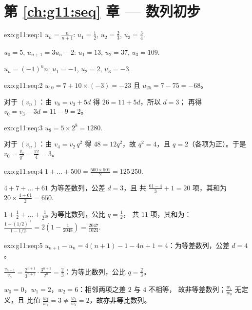 \section*{第 \ref{ch:g11:seq} 章 --- 数列初步}

\begin{solution}{exo:g11:seq:1}
$u_n = \frac{n}{n+1}$: $u_1 = \frac12$, $u_2 = \frac23$,
$u_3 = \frac34$.

$u_0 = 5$, $u_{n+1} = 3u_n - 2$: $u_1 = 13$, $u_2 = 37$, $u_3 = 109$.

$u_n = (-1)^n n$: $u_1 = -1$, $u_2 = 2$, $u_3 = -3$.
\end{solution}

\begin{solution}{exo:g11:seq:2}
$u_{10} = 7 + 10 \times (-3) = -23$ 且 $u_{25} = 7 - 75 = -68$。

对于 $(v_n)$：由 $v_8 = v_3 + 5d$ 得 $26 = 11 + 5d$，所以 $d = 3$；
再得 $v_0 = v_3 - 3d = 11 - 9 = 2$。
\end{solution}

\begin{solution}{exo:g11:seq:3}
$u_8 = 5 \times 2^8 = 1280$.

对于 $(v_n)$：由 $v_4 = v_2\, q^2$ 得 $48 = 12 q^2$，故 $q^2 = 4$，且
$q = 2$（各项为正）。于是
$v_0 = \frac{v_2}{q^2} = \frac{12}{4} = 3$。
\end{solution}

\begin{solution}{exo:g11:seq:4}
$1 + \dots + 500 = \frac{500 \times 501}{2} = 125\,250$.

$4 + 7 + \dots + 61$ 为等差数列，公差 $d = 3$，且
共 $\frac{61 - 4}{3} + 1 = 20$ 项，其和为
$20 \times \frac{4 + 61}{2} = 650$.

$1 + \frac12 + \dots + \frac{1}{2^{10}}$ 为等比数列，公比 $q = \frac12$，
共 $11$ 项，其和为：
$\frac{1 - (1/2)^{11}}{1 - 1/2} = 2\left(1 - \frac{1}{2048}\right)
= \frac{2047}{1024}$.
\end{solution}

\begin{solution}{exo:g11:seq:5}
$u_{n+1} - u_n = 4(n+1) - 1 - 4n + 1 = 4$：为等差数列，公差 $d = 4$。

$\frac{v_{n+1}}{v_n} = \frac{2^{n+1}}{3^{n+2}} \cdot \frac{3^{n+1}}{2^n}
= \frac23$：为等比数列，公比 $q = \frac23$。

$w_0 = 0$，$w_1 = 2$，$w_2 = 6$：相邻两项之差 $2$ 与 $4$ 不相等，
故非等差数列；$\frac{w_1}{w_0}$ 无定义，且
比值 $\frac{w_2}{w_1} = 3 \neq \frac{w_3}{w_2} = 2$，故亦非等比数列。
\end{solution}

